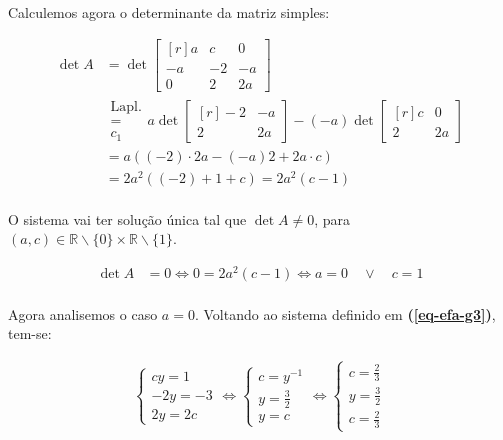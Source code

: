 \paragraph{} Calculemos agora o determinante da matriz simples:

\begin{align*}
	\det A
	&=
	\det
	\begin{bmatrix*}[r]
		a  & c  & 0\\
		-a & -2 & -a\\
		0  & 2  & 2a
	\end{bmatrix*}\\
	&
	\begin{matrix}
		\text{Lapl.}\\
		=\\
		c_1
	\end{matrix}
	a
	\det
	\begin{bmatrix*}[r]
		-2 & -a\\
		2  & 2a
	\end{bmatrix*}
	-
	(-a)
	\det
	\begin{bmatrix*}[r]
		c  & 0\\
		2  & 2a
	\end{bmatrix*}\\
	&
	=
	a\left(
		(-2) \cdot 2a
		- (-a) 2
	+
		2a \cdot c\right)\\
	&
	=
	2a^2\left(
		(-2)
		+ 1
	+
		c\right) = 2a^2(c - 1)
\end{align*}

\paragraph{}O sistema vai ter solução única tal que $\det A \neq 0$, para
$(a, c) \in \mathbb{R}\backslash\{0\} \times \mathbb{R}\backslash\{1\}$.

\begin{align*}
	\det A &= 0
	\iff 0 = 2a^2(c - 1)
	\iff a = 0 \quad \lor \quad  c = 1
\end{align*}

\paragraph{}Agora analisemos o caso $a = 0$. Voltando ao sistema definido em
\textbf{(\ref{eq-efa-g3})}, tem-se:

\begin{align*}
	\begin{cases}
		cy = 1\\
		- 2y = -3\\
		2y = 2c
	\end{cases}
	\iff
	\begin{cases}
		c = y^{-1}\\
		y = \frac{3}{2}\\
		y = c
	\end{cases}
	\iff
	\begin{cases}
		c = \frac{2}{3}\\
		y = \frac{3}{2}\\
		c = \frac{2}{3}
	\end{cases}
\end{align*}

